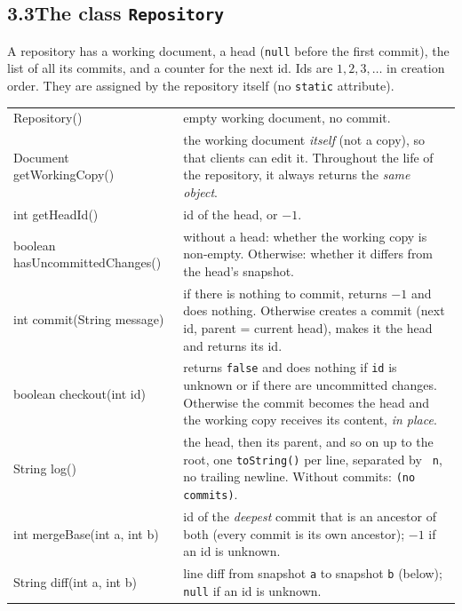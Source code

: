 \documentclass[11pt,a4paper]{article}
\newcommand{\code}[1]{\lstinline[basicstyle=\ttfamily\normalsize,basewidth=0.5em]{#1}}
\newcommand{\nl}{\texttt{\char13\char92 n\char13}}
\begin{document}
\subsection*{3.3\quad The class \texttt{Repository}}

A repository has a working document, a head (\code{null} before the first
commit), the list of all its commits, and a counter for the next id. Ids are
$1, 2, 3, \dots$ in creation order. They are assigned by the repository
itself (no \code{static} attribute).

\begin{tabular}{@{}S{0.40\textwidth} D{0.55\textwidth}@{}}
Repository() & empty working document, no commit. \\
Document getWorkingCopy() & the working document \emph{itself} (not a copy), so that clients can edit it. Throughout the life of the repository, it always returns the \emph{same object}. \\
int getHeadId() & id of the head, or $-1$. \\
boolean hasUncommittedChanges() & without a head: whether the working copy is non-empty. Otherwise: whether it differs from the head's snapshot. \\
int commit(String message) & if there is nothing to commit, returns $-1$ and does nothing. Otherwise creates a commit (next id, parent = current head), makes it the head and returns its id. \\
boolean checkout(int id) & returns \code{false} and does nothing if \code{id} is unknown or if there are uncommitted changes. Otherwise the commit becomes the head and the working copy receives its content, \emph{in place}. \\
String log() & the head, then its parent, and so on up to the root, one \code{toString()} per line, separated by \nl, no trailing newline. Without commits: \code{(no commits)}. \\
int mergeBase(int a, int b) & id of the \emph{deepest} commit that is an ancestor of both (every commit is its own ancestor); $-1$ if an id is unknown. \\
String diff(int a, int b) & line diff from snapshot \code{a} to snapshot \code{b} (below); \code{null} if an id is unknown. \\
\end{tabular}
\end{document}
